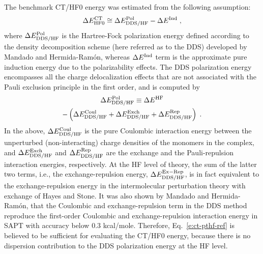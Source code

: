 \documentclass[aip,jcp,amsmath,amssymb,reprint,floatfix]{revtex4-1}
\begin{document}
The benchmark CT/HF0 energy was estimated
from the following assumption:
%
\begin{equation}\label{e:ct-pthf-ref}
 \Delta E^{\rm CT}_{\rm HF0} \cong \Delta E^{\rm Pol}_{\rm DDS/HF} 
 - \Delta E^{\rm Ind} \;,
\end{equation}
%
where $\Delta E^{\rm Pol}_{\rm DDS/HF}$ is the Hartree\hyp{}Fock polarization energy
defined
according to the density decomposition scheme (here referred as to the DDS) 
developed by Mandado and Hermida\hyp{}Ram{\'o}n,\cite{Mandado.Hermida-Ramon.JCTC.2011} 
whereas $\Delta E^{\rm Ind}$ term is the 
approximate pure induction energy due to the polarizability effects.\cite{Stone.TheTheoryOfIntermolecularForces.1996}
The DDS polarization energy encompasses all the charge delocalization
effects that are not associated with the Pauli exclusion principle
in the first order, and is computed by
%
\begin{multline}\label{e:de-pol-dds}
\Delta E^{\rm Pol}_{\rm DDS/HF} \equiv \Delta E^{\rm HF} \\
 - \left(
   \Delta E^{\rm Coul}_{\rm DDS/HF}
 + \Delta E^{\rm Exch}_{\rm DDS/HF}
 + \Delta E^{\rm Rep}_{\rm DDS/HF} 
   \right)\;.
\end{multline}
%
In the above, $\Delta E^{\rm Coul}_{\rm DDS/HF}$ is the pure Coulombic interaction energy
between the unperturbed (non\hyp{}interacting) charge densities of the monomers in the complex,
and
$\Delta E^{\rm Exch}_{\rm DDS/HF}$ and $\Delta E^{\rm Rep}_{\rm DDS/HF}$
are the exchange and the Pauli\hyp{}repulsion interaction energies, respectively.
At the HF level of theory, the sum of the latter two terms,
i.e., the exchange\hyp{}repulsion energy, $\Delta E^{\rm Ex-Rep}_{\rm DDS/HF}$,
is in fact
equivalent to the exchange\hyp{}repulsion energy 
in the intermolecular perturbation theory with exchange of Hayes and Stone.\cite{Hayes.Stone.MolPhys.1984} 
It was also shown by 
Mandado and Hermida\hyp{}Ram{\'o}n,\cite{Mandado.Hermida-Ramon.JCTC.2011}
that the Coulombic and exchange\hyp{}repulsion term
in the DDS method reproduce the first\hyp{}order Coulombic and exchange\hyp{}repulsion
interaction energy in SAPT\cite{Jeziorski.Moszynski.Szalewicz.ChemRev.1994}
with accuracy below 0.3 kcal/mole.
Therefore, Eq.~\eqref{e:ct-pthf-ref} is believed to be sufficient
for evaluating the CT/HF0 energy, because there is no dispersion
contribution to the DDS polarization energy at the HF level.
\end{document}
